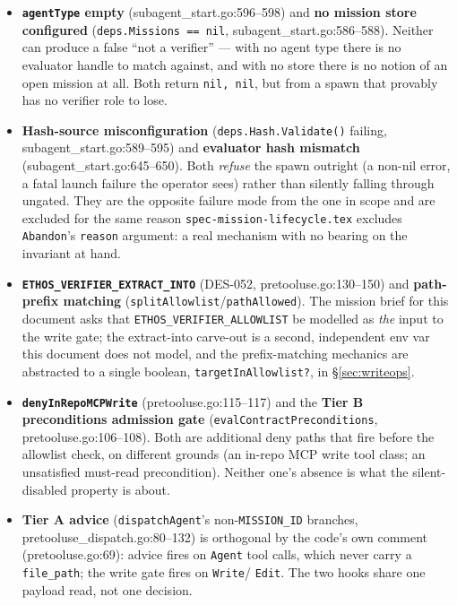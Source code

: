 \documentclass[a4paper,10pt,fleqn]{article}
\newcommand{\fpath}[1]{\texttt{#1}}
\newcommand{\field}[1]{\texttt{#1}}
\begin{document}
\begin{itemize}
  \item \textbf{\field{agentType} empty} (subagent\_start.go:596--598)
    and \textbf{no mission store configured}
    (\field{deps.Missions == nil}, subagent\_start.go:586--588).
    Neither can produce a false ``not a verifier'' --- with no agent
    type there is no evaluator handle to match against, and with no
    store there is no notion of an open mission at all. Both return
    \field{nil, nil}, but from a spawn that provably has no verifier
    role to lose.
  \item \textbf{Hash-source misconfiguration}
    (\field{deps.Hash.Validate()} failing, subagent\_start.go:589--595)
    and \textbf{evaluator hash mismatch}
    (subagent\_start.go:645--650). Both \emph{refuse} the spawn
    outright (a non-nil error, a fatal launch failure the operator
    sees) rather than silently falling through ungated. They are the
    opposite failure mode from the one in scope and are excluded for
    the same reason \fpath{spec-mission-lifecycle.tex} excludes
    \field{Abandon}'s \field{reason} argument: a real mechanism with
    no bearing on the invariant at hand.
  \item \textbf{\field{ETHOS\_VERIFIER\_EXTRACT\_INTO}} (DES-052,
    pretooluse.go:130--150) and \textbf{path-prefix matching}
    (\field{splitAllowlist}/\field{pathAllowed}). The mission brief
    for this document asks that \field{ETHOS\_VERIFIER\_ALLOWLIST} be
    modelled as \emph{the} input to the write gate; the extract-into
    carve-out is a second, independent env var this document does
    not model, and the prefix-matching mechanics are abstracted to a
    single boolean, \field{targetInAllowlist?}, in
    \S\ref{sec:writeops}.
  \item \textbf{\field{denyInRepoMCPWrite}} (pretooluse.go:115--117)
    and the \textbf{Tier B preconditions admission gate}
    (\field{evalContractPreconditions}, pretooluse.go:106--108). Both
    are additional deny paths that fire before the allowlist check,
    on different grounds (an in-repo MCP write tool class; an
    unsatisfied must-read precondition). Neither one's absence is
    what the silent-disabled property is about.
  \item \textbf{Tier A advice} (\field{dispatchAgent}'s
    non-\field{MISSION\_ID} branches, pretooluse\_dispatch.go:80--132)
    is orthogonal by the code's own comment (pretooluse.go:69):
    advice fires on \field{Agent} tool calls, which never carry a
    \field{file\_path}; the write gate fires on \field{Write}/
    \field{Edit}. The two hooks share one payload read, not one
    decision.
\end{itemize}
\end{document}
